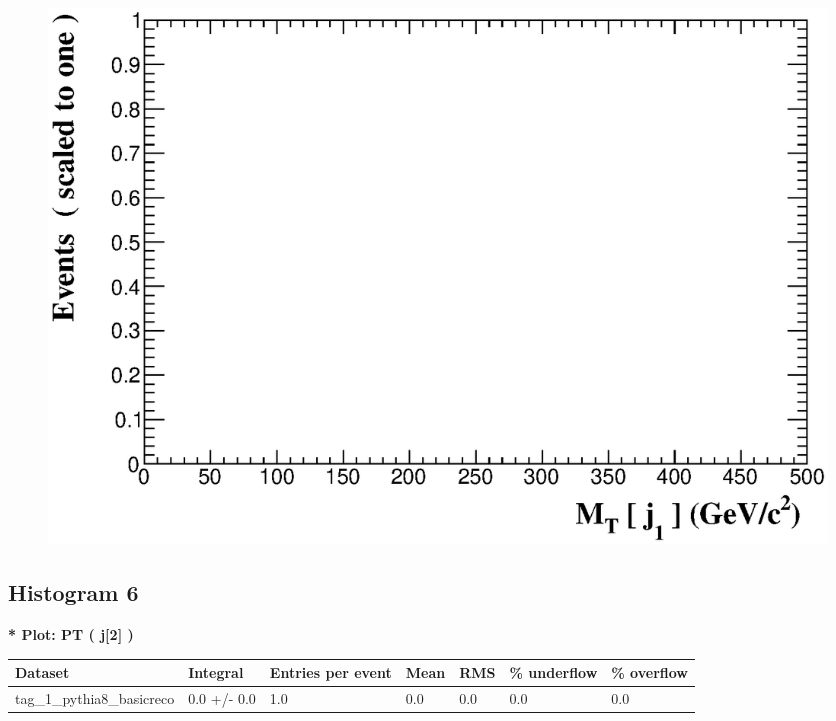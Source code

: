 \documentclass[a4paper, 10pt]{article}
\begin{document}
\begin{figure}[H]
  \begin{center}
    \includegraphics[scale=0.45]{selection_4.eps}\\
\caption{   }
  \end{center}
\end{figure}
      \newpage
\subsection{ Histogram 6}

\textbf{* Plot: PT ( j[2] ) }\\
   \begin{table}[H]
  \begin{center}
    \begin{tabular}{|m{23.0mm}|m{23.0mm}|m{18.0mm}|m{19.0mm}|m{19.0mm}|m{19.0mm}|m{19.0mm}|}
      \hline
      {\cellcolor{yellow}         Dataset}& {\cellcolor{yellow}         Integral}& {\cellcolor{yellow}         Entries per event}& {\cellcolor{yellow}         Mean}& {\cellcolor{yellow}         RMS}& {\cellcolor{yellow}         \% underflow}& {\cellcolor{yellow}         \% overflow}\\
      \hline
      {\cellcolor{white}         tag\_1\_pythia8\_basicreco}& {\cellcolor{white}         0.0 +/\-- 0.0}& {\cellcolor{white}         1.0}& {\cellcolor{white}         0.0}& {\cellcolor{white}         0.0}& {\cellcolor{green}         0.0}& {\cellcolor{green}         0.0}\\
\hline
    \end{tabular}
  \end{center}
\end{table}
\end{document}
